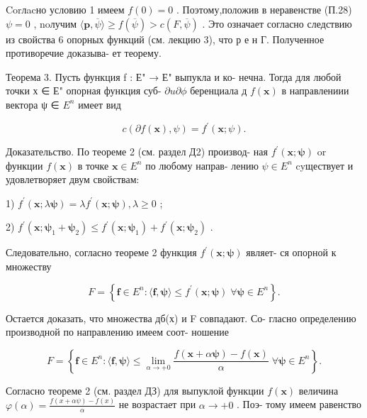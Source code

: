 \documentclass[8pt]{extarticle}
\begin{document}
Corлacно условию 1 имеем \(f\left( 0\right)  = 0\) . Поэтому,положив в неравенстве (П.28) \(\psi  = 0\) , noлучим \(\langle \mathbf{p},\overline{\psi }\rangle  \geq  f\left( \overline{\psi }\right)  > c\left( {F,\overline{\psi }}\right)\) . Это означает согласно следствию из свойства 6 опорных функций (см. лекцию 3), что р е н Г. Полученное противоречие доказыва- ет теорему.

Теорема 3. Пусть функция f : Е" → Е" выпукла и ко- нечна. Тогда для любой точки х ∈ Е" опорная функция суб- \(\partial u\partial \phi\) беренциала д \(f\left( \mathbf{x}\right)\) в направлениии вектора ψ ∈ \({E}^{n}\) имеет вид

\[
c\left( {\partial f\left( \mathbf{x}\right) ,\psi }\right)  = {f}^{\prime }\left( {\mathbf{x};\psi }\right) .
\]

Доказательство. По теореме 2 (см. раздел Д2) производ- ная \({f}^{\prime }\left( {\mathbf{x};\mathbf{\psi }}\right)\) or функции \(f\left( \mathbf{x}\right)\) в точке \(\mathbf{x} \in  {E}^{n}\) по любому направ- лению \(\psi  \in  {E}^{n}\) cyществует и удовлетворяет двум свойствам:

1) \({f}^{\prime }\left( {\mathbf{x};\lambda \mathbf{\psi }}\right)  = \lambda {f}^{\prime }\left( {\mathbf{x};\mathbf{\psi }}\right) ,\lambda  \geq  0\) ;

2) \({f}^{\prime }\left( {\mathbf{x};{\mathbf{\psi }}_{1} + {\mathbf{\psi }}_{2}}\right)  \leq  {f}^{\prime }\left( {\mathbf{x};{\mathbf{\psi }}_{1}}\right)  + {f}^{\prime }\left( {\mathbf{x};{\mathbf{\psi }}_{2}}\right)\) .

Следовательно, согласно теореме 2 функция \({f}^{\prime }\left( {\mathbf{x};\mathbf{\psi }}\right)\) являет- ся опорной к множеству

\[
F = \left\{  {\mathbf{f} \in  {E}^{n} : \langle \mathbf{f},\mathbf{\psi }\rangle  \leq  {f}^{\prime }\left( {\mathbf{x};\mathbf{\psi }}\right) \;\forall \mathbf{\psi } \in  {E}^{n}}\right\}  .
\]

Остается доказать, что множества дб(х) и F совпадают. Со- гласно определению производной по направлению имеем соот- ношение

\[
F = \left\{  {\mathbf{f} \in  {E}^{n} : \langle \mathbf{f},\mathbf{\psi }\rangle  \leq  \mathop{\lim }\limits_{{\alpha  \rightarrow   + 0}}\frac{f\left( {\mathbf{x} + \alpha \mathbf{\psi }}\right)  - f\left( \mathbf{x}\right) }{\alpha }\;\forall \mathbf{\psi } \in  {E}^{n}}\right\}  .
\]

Согласно теореме 2 (см. раздел ДЗ) для выпуклой функции \(f\left( \mathbf{x}\right)\) величина \(\varphi \left( \alpha \right)  = \frac{f\left( {x + {\alpha \psi }}\right)  - f\left( x\right) }{\alpha }\) не возрастает при \(\alpha  \rightarrow   + 0\) . Поэ- тому имеем равенство
\end{document}

